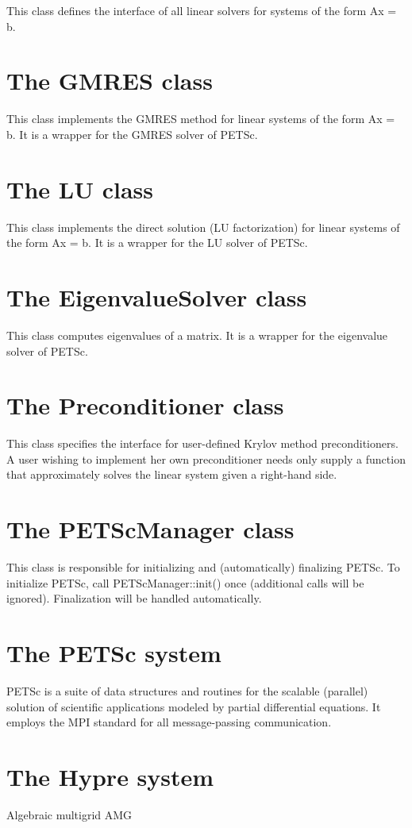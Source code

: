 This class defines the interface of all linear solvers for
systems of the form Ax = b.

\section{The GMRES class}

This class implements the GMRES method for linear systems
of the form Ax = b. It is a wrapper for the GMRES solver
of PETSc.

\section{The LU class}

This class implements the direct solution (LU factorization) for
linear systems of the form Ax = b. It is a wrapper for the LU
solver of PETSc.

\section{The EigenvalueSolver class}

This class computes eigenvalues of a matrix. It is 
a wrapper for the eigenvalue solver of PETSc.

\section{The Preconditioner class}

This class specifies the interface for user-defined Krylov
method preconditioners. A user wishing to implement her own
preconditioner needs only supply a function that approximately
solves the linear system given a right-hand side.

\section{The PETScManager class}

This class is responsible for initializing and (automatically)
finalizing PETSc. To initialize PETSc, call PETScManager::init()
once (additional calls will be ignored). Finalization will be
handled automatically.

\section{The PETSc system}

PETSc is a suite of data structures and routines for the scalable 
(parallel) solution of scientific applications modeled by partial 
differential equations.  It employs the MPI standard for all message-passing communication.  

\section{The Hypre system}

Algebraic multigrid AMG

